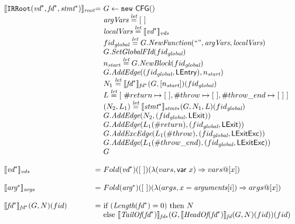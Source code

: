 \[
\begin{array}{l@{}l@{~}l}

\transfun{\TT{IRRoot}(\emph{vd}^*, \emph{fd}^*, \emph{stmt}^*)}_{\emph{root}} & = &
	G \leftarrow \TT{new}\ \CFG{\tt()}\\
	& & \argVars \letval [\ ] \\
	& & \localVars \letval \transfun{\emph{vd}^*}_{\emph{vds}} \\
	& & fid_{\emph{global}} \letval G.\emph{NewFunction}(`` ", \argVars, \localVars)\\
	& & G.\emph{SetGlobalFId}(fid_{\emph{global}}) \\
	& & n_{\emph{start}} \letval G.\emph{NewBlock}(fid_{\emph{global}})\\
	& & G.\emph{AddEdge}((fid_{\emph{global}},\LEntry), n_{\emph{start}})\\
	& & N_1 \letval \transfun{\emph{fd}^*}_{\emph{fd}^*}(G,[n_{\emph{start}}])(fid_{\emph{global}})\\
	& & L \letval [\ \#return \mapsto [\ ], \#throw \mapsto [\ ] , \#throw\_end \mapsto [\ ]\ ] \\
	& & (N_2,L_1) \letval \transfun{\emph{stmt}^*}_{\emph{stmt}*}(G,N_1,L)(fid_{\emph{global}})\\
	& & G.\emph{AddEdge}(N_2,(fid_{\emph{global}},\LExit))\\
	& & G.\emph{AddEdge}(L_1(\#return),(fid_{\emph{global}},\LExit))\\
	& & G.\emph{AddExcEdge}(L_1(\#throw),(fid_{\emph{global}},\LExitExc))\\
	& & G.\emph{AddEdge}(L_1(\#throw\_end),(fid_{\emph{global}},\LExitExc))\\
	& & G\\
	& & \\

\transfun{\emph{vd}^*}_{\emph{vds}} & = &
	Fold(\emph{vd}^*)([\ ])(\lambda(vars, \irvar{x})\Rightarrow vars @ [x])\\
	& & \\

\transfun{\emph{arg}^*}_{\emph{args}} & = &
	Fold(\emph{arg}^*)([\ ])(\lambda(args, x = \emph{arguments}[i])\Rightarrow args @ [x])\\
	& & \\

\transfun{\emph{fd}^*}_{\emph{fd}^*}(G,N)(fid) & = &
	\mbox{if}\ (\Length(\emph{fd}^*) = 0)\ \mbox{then}\ N\\
	& & \mbox{else}\ \transfun{\TailOf(\emph{fd}^*)}_{\emph{fd}*}(G, \transfun{\HeadOf(\emph{fd}^*)}_{\emph{fd}}(G,N)(fid))(fid)\\
	& & \\


\end{array}\]
